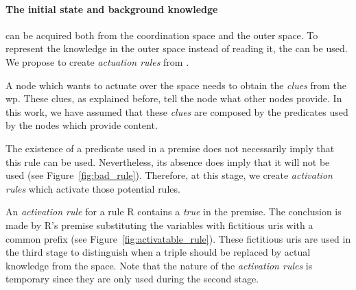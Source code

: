 \paragraph{The initial state and background knowledge} can be acquired both from the coordination space and the outer space.
To represent the knowledge in the outer space instead of reading it, the \clues{} can be used.
We propose to create \emph{actuation rules} from \clues{}.


A node which wants to actuate over the space needs to obtain the \emph{clues} from the \ac{wp}.
These clues, as explained before, tell the node what other nodes provide.
In this work, we have assumed that these \emph{clues} are composed by the predicates used by the nodes which provide content.


The existence of a predicate used in a premise does not necessarily imply that this rule can be used.
Nevertheless, its absence does imply that it will not be used (see Figure~\ref{fig:bad_rule}).
Therefore, at this stage, we create \emph{activation rules} which activate those potential rules. %


% 


An \emph{activation rule} for a rule R contains a \emph{true} in the premise.
The conclusion is made by R's premise substituting the variables with fictitious \acsp{uri} with a common prefix (see Figure~\ref{fig:activatable_rule}).
These fictitious \acsp{uri} are used in the third stage to distinguish when a triple should be replaced by actual knowledge from the space. %
Note that the nature of the \emph{activation rules} is temporary since they are only used during the second stage.



